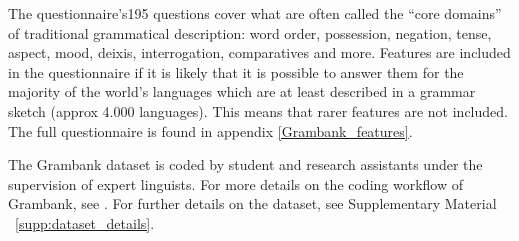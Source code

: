 \documentclass[draft,10pt]{article} %
\begin{document}
 


The questionnaire's195 questions cover what are often called the ``core domains'' of traditional grammatical description: word order, possession, negation, tense, aspect, mood, deixis, interrogation, comparatives and more. Features are included in the questionnaire if it is likely that it is possible to answer them for the majority of the world's languages which are at least described in a grammar sketch (approx 4.000 languages). This means that rarer features are not included. The full questionnaire is found in appendix \ref{Grambank_features}. 

The Grambank dataset is coded by student and research assistants under the supervision of expert linguists. For more details on the coding workflow of Grambank, see \citet{slingerland2020coding}. For further details on the dataset, see Supplementary Material ~\ref{supp:dataset_details}.

\end{document}
